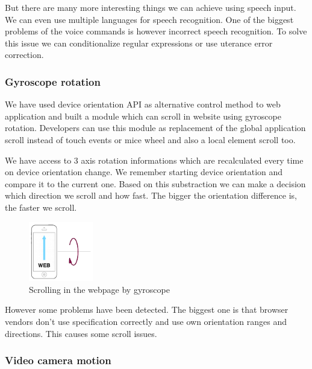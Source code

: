 \documentclass{iitsrc}
\begin{document}
But there are many more interesting things we can achieve using speech input. We can even use multiple languages for speech recognition. One of the biggest problems of the voice commands is however incorrect speech recognition. To solve this issue we can conditionalize regular expressions or use uterance error correction.


\subsubsection{Gyroscope rotation} %
\label{ssub:gyroscope_rotation}

We have used device orientation API as alternative control method to web application and built a module which can scroll in website using gyroscope rotation. Developers can use this module as replacement of the global application scroll instead of touch events or mice wheel and also a local element scroll too.

We have access to 3 axis rotation informations which are recalculated every time on device orientation change. We remember starting device orientation and compare it to the current one. Based on this substraction we can make a decision which direction we scroll and how fast. The bigger the orientation difference is, the faster we scroll.

\begin{figure}[h]
    \begin{center}
        \includegraphics[width=0.25\textwidth]{../images/gyroscope}
        \caption{Scrolling in the webpage by gyroscope}
        \label{fig:gyroscope}
    \end{center}
\end{figure}

However some problems have been detected. The biggest one is that browser vendors don't use specification correctly and use own orientation ranges and directions. This causes some scroll issues.


\subsubsection{Video camera motion} %
\label{ssub:video_camera_motion}
\end{document}
